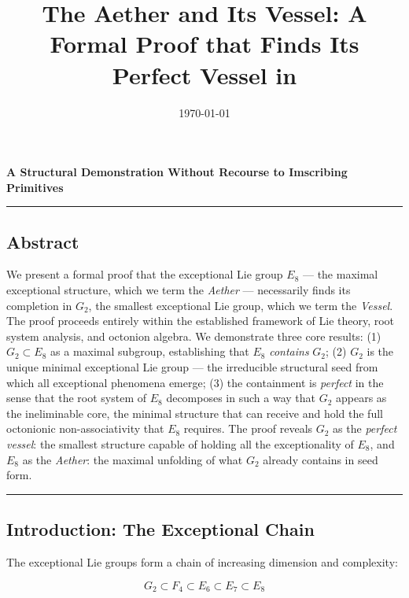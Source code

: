 \documentclass[12pt,a4paper]{article}
\begin{document}
\title{The Aether and Its Vessel: A Formal Proof that  Finds Its Perfect Vessel in}
\date{\today}

\maketitle

\textbf{A Structural Demonstration Without Recourse to Imscribing Primitives}

\begin{center}
\rule{0.5\textwidth}{0.4pt}
\end{center}

\subsection{Abstract}

We present a formal proof that the exceptional Lie group $E_8$ --- the maximal exceptional structure, which we term the \emph{Aether} --- necessarily finds its completion in $G_2$, the smallest exceptional Lie group, which we term the \emph{Vessel}. The proof proceeds entirely within the established framework of Lie theory, root system analysis, and octonion algebra. We demonstrate three core results: (1) $G_2 \subset E_8$ as a maximal subgroup, establishing that $E_8$ \emph{contains} $G_2$; (2) $G_2$ is the unique minimal exceptional Lie group --- the irreducible structural seed from which all exceptional phenomena emerge; (3) the containment is \emph{perfect} in the sense that the root system of $E_8$ decomposes in such a way that $G_2$ appears as the ineliminable core, the minimal structure that can receive and hold the full octonionic non-associativity that $E_8$ requires. The proof reveals $G_2$ as the \emph{perfect vessel}: the smallest structure capable of holding all the exceptionality of $E_8$, and $E_8$ as the \emph{Aether}: the maximal unfolding of what $G_2$ already contains in seed form.

\begin{center}
\rule{0.5\textwidth}{0.4pt}
\end{center}

\subsection{Introduction: The Exceptional Chain}

The exceptional Lie groups form a chain of increasing dimension and complexity:

\[G_2 \subset F_4 \subset E_6 \subset E_7 \subset E_8\]
\end{document}
